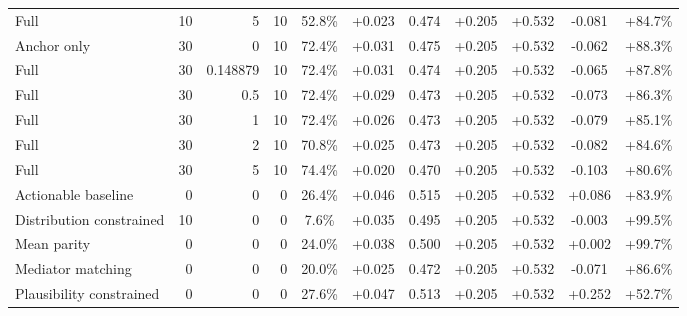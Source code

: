\begin{table}[htbp]
\begin{tabular}{lrrrccccccc}
Full & 10 & 5 & 10 & 52.8\% & +0.023 & 0.474 & +0.205 & +0.532 & -0.081 & +84.7\% \\
Anchor only & 30 & 0 & 10 & 72.4\% & +0.031 & 0.475 & +0.205 & +0.532 & -0.062 & +88.3\% \\
Full & 30 & 0.148879 & 10 & 72.4\% & +0.031 & 0.474 & +0.205 & +0.532 & -0.065 & +87.8\% \\
Full & 30 & 0.5 & 10 & 72.4\% & +0.029 & 0.473 & +0.205 & +0.532 & -0.073 & +86.3\% \\
Full & 30 & 1 & 10 & 72.4\% & +0.026 & 0.473 & +0.205 & +0.532 & -0.079 & +85.1\% \\
Full & 30 & 2 & 10 & 70.8\% & +0.025 & 0.473 & +0.205 & +0.532 & -0.082 & +84.6\% \\
Full & 30 & 5 & 10 & 74.4\% & +0.020 & 0.470 & +0.205 & +0.532 & -0.103 & +80.6\% \\
Actionable baseline & 0 & 0 & 0 & 26.4\% & +0.046 & 0.515 & +0.205 & +0.532 & +0.086 & +83.9\% \\
Distribution constrained & 10 & 0 & 0 & 7.6\% & +0.035 & 0.495 & +0.205 & +0.532 & -0.003 & +99.5\% \\
Mean parity & 0 & 0 & 0 & 24.0\% & +0.038 & 0.500 & +0.205 & +0.532 & +0.002 & +99.7\% \\
Mediator matching & 0 & 0 & 0 & 20.0\% & +0.025 & 0.472 & +0.205 & +0.532 & -0.071 & +86.6\% \\
Plausibility constrained & 0 & 0 & 0 & 27.6\% & +0.047 & 0.513 & +0.205 & +0.532 & +0.252 & +52.7\% \\
\bottomrule
\end{tabular}
\end{table}